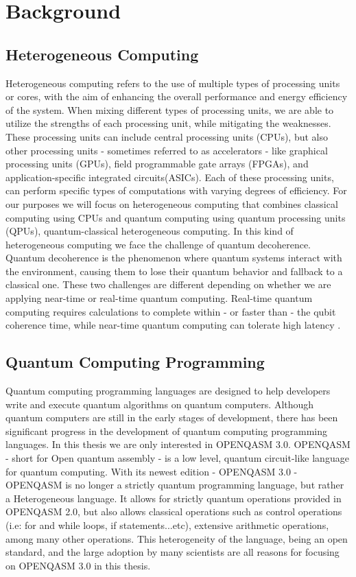 \chapter{Background}
\label{chapter:Background}
\section{Heterogeneous Computing}
Heterogeneous computing refers to the use of multiple types of processing units
or cores, with the aim
of enhancing the overall performance and energy efficiency of 
the system.
When mixing different types of processing units, we are able to
utilize the strengths of each processing unit, while mitigating the weaknesses.
These processing units can include
central processing units (CPUs), but also other processing units - sometimes referred to as accelerators -
like  graphical processing units (GPUs), 
field programmable gate arrays (FPGAs), and application-specific integrated circuits(ASICs).
Each of these processing units, can perform  
specific types of computations with varying degrees of efficiency. 
For our purposes we will focus on heterogeneous computing that combines classical
computing using CPUs and quantum computing using quantum processing units (QPUs), quantum-classical
heterogeneous computing.
In this kind of heterogeneous computing we face the challenge of quantum
decoherence. Quantum decoherence is the phenomenon where quantum systems interact
with the environment, causing them to lose their
quantum behavior and fallback to a classical one.
These two challenges are different depending on whether we are applying
near-time or real-time quantum computing. Real-time quantum computing requires calculations to
complete within - or faster than - the qubit coherence time, while near-time quantum computing can tolerate high
latency \cite{Near-Real}.
\section{Quantum Computing Programming}
Quantum computing programming languages are designed to help developers write
and execute quantum algorithms on quantum computers. Although quantum computers
are still in the early stages of development, there has been significant
progress in the development of quantum computing programming languages. In this
thesis we are only interested in OPENQASM 3.0. OPENQASM - short for Open quantum
assembly - is a low level, quantum circuit-like language for quantum computing.
With its newest edition - OPENQASM 3.0 - OPENQASM is no longer a strictly
quantum programming language, but rather a Heterogeneous language. It allows for
strictly quantum operations provided in OPENQASM 2.0, but also allows classical
operations such as control operations (i.e: for and while loops, if
statements...etc), extensive arithmetic operations, among many other operations.
This heterogeneity of the language, being an open standard, and the large
adoption by many scientists are all reasons for focusing on OPENQASM 3.0 in this
thesis.
